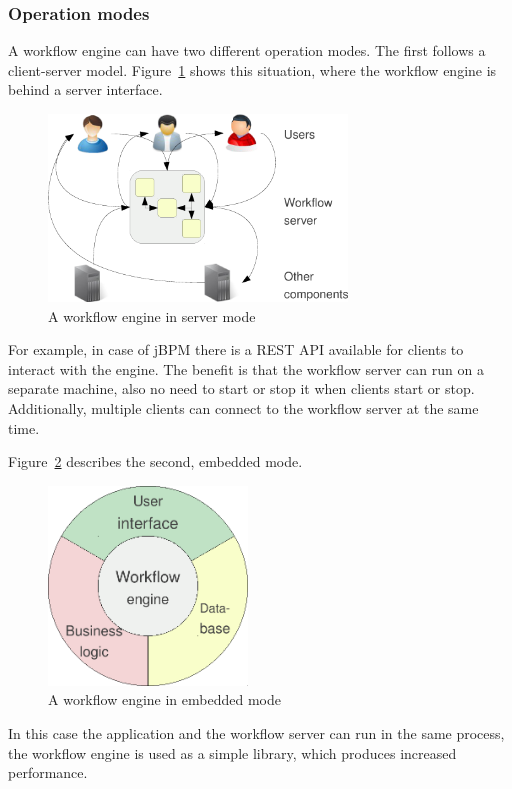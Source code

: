 \subsubsection*{Operation modes}

A workflow engine can have two different operation modes. The first follows a
client-server model. Figure~\ref{fig:workflow-server} shows this situation,
where the workflow engine is behind a server interface.

\begin{figure}[H]
\centering
\includegraphics[width=300px,keepaspectratio]{workflow-server.pdf}
\caption{A workflow engine in server mode}
\label{fig:workflow-server}
\end{figure}

For example, in case of jBPM there is a REST API available for clients to
interact with the engine. The benefit is that the workflow server can run on a
separate machine, also no need to start or stop it when clients start or stop.
Additionally, multiple clients can connect to the workflow server at the same
time.

Figure~\ref{fig:workflow-embedded} describes the second, embedded mode.

\begin{figure}[H]
\centering
\includegraphics[width=200px,keepaspectratio]{workflow-embedded.pdf}
\caption{A workflow engine in embedded mode}
\label{fig:workflow-embedded}
\end{figure}

In this case the application and the workflow server can run in the same
process, the workflow engine is used as a simple library, which produces
increased performance.

